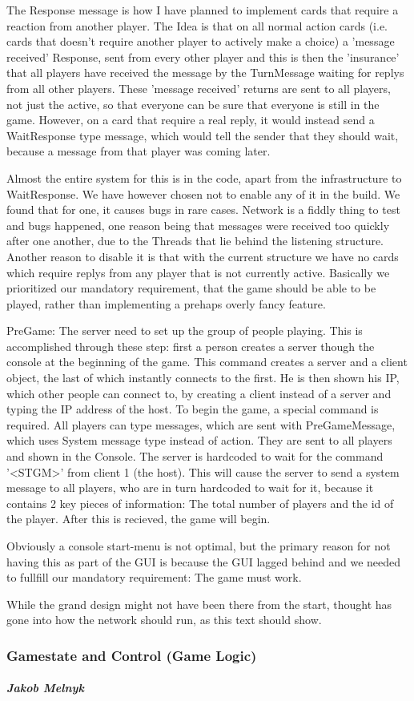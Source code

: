 The Response message is how I have planned to implement cards that require a reaction from another player.
The Idea is that on all normal action cards (i.e. cards that doesn't require another player to actively make a choice) a 'message received' Response, sent from every other player and this is then the 'insurance' that all players have received the message by the TurnMessage waiting for replys from all other players. 
These 'message received' returns are sent to all players, not just the active, so that everyone can be sure that everyone is still in the game.
However, on a card that require a real reply, it would instead send a WaitResponse type message, which would tell the sender that they should wait, because a message from that player was coming later.

Almost the entire system for this is in the code, apart from the infrastructure to WaitResponse. 
We have however chosen not to enable any of it in the build. We found that for one, it causes bugs in rare cases.
Network is a fiddly thing to test and bugs happened, one reason being that messages were received too quickly after one another, due to the Threads that lie behind the listening structure. Another reason to disable it is that with the current structure we have no cards which require replys from any player that is not currently active.
Basically we prioritized our mandatory requirement, that the game should be able to be played, rather than implementing a prehaps overly fancy feature.

PreGame:
The server need to set up the group of people playing. 
This is accomplished through these step: first a person creates a server though the console at the beginning of the game. 
This command creates a server and a client object, the last of which instantly connects to the first. 
He is then shown his IP, which other people can connect to, by creating a client instead of a server and typing the IP address of the host.
To begin the game, a special command is required. All players can type messages, which are sent with PreGameMessage, which uses System message type instead of action. 
They are sent to all players and shown in the Console. The server is hardcoded to wait for the command '<STGM>' from client 1 (the host). 
This will cause the server to send a system message to all players, who are in turn hardcoded to wait for it, because it contains 2 key pieces of information: The total number of players and the id of the player. 
After this is recieved, the game will begin.

Obviously a console start-menu is not optimal, but the primary reason for not having this as part of the GUI is because the GUI lagged behind and we needed to fullfill our mandatory requirement: The game must work.

While the grand design might not have been there from the start, thought has gone into how the network should run, as this text should show.

\subsubsection{Gamestate and Control (Game Logic)}
\subparagraph{Jakob Melnyk}
